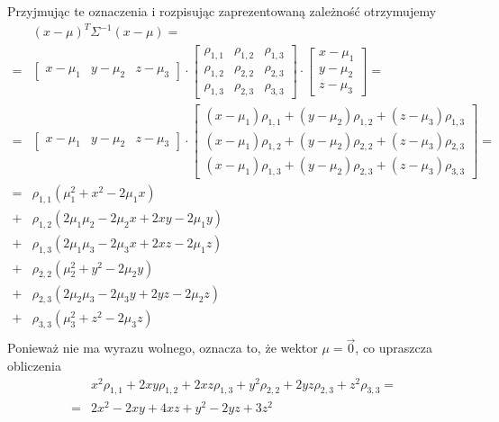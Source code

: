 Przyjmując te oznaczenia i rozpisując zaprezentowaną zależność otrzymujemy
\begin{align*}
&(x-\mu)^T\Sigma^{-1}(x-\mu)
=\\=&
\begin{bmatrix}
	x-\mu _1 & y-\mu _2 & z-\mu _3
\end{bmatrix}\cdot
\begin{bmatrix}
	\rho _{1,1} & \rho _{1,2} & \rho _{1,3} \\
	\rho _{1,2} & \rho _{2,2} & \rho _{2,3} \\
	\rho _{1,3} & \rho _{2,3} & \rho _{3,3}
\end{bmatrix}\cdot
\begin{bmatrix}
	x-\mu _1 \\
	y-\mu _2 \\
	z-\mu _3
\end{bmatrix}
=\\=&
\begin{bmatrix}
	x-\mu _1 & y-\mu _2 & z-\mu _3
\end{bmatrix}\cdot
\begin{bmatrix}
	\left(x-\mu _1\right) \rho _{1,1}+\left(y-\mu
   _2\right) \rho _{1,2}+\left(z-\mu _3\right) \rho
   _{1,3} \\
	\left(x-\mu _1\right) \rho _{1,2}+\left(y-\mu
   _2\right) \rho _{2,2}+\left(z-\mu _3\right) \rho
   _{2,3} \\
	\left(x-\mu _1\right) \rho _{1,3}+\left(y-\mu
   _2\right) \rho _{2,3}+\left(z-\mu _3\right) \rho
   _{3,3}
\end{bmatrix}
=\\=&
 \rho _{1,1} \left(\mu _1^2+x^2-2 \mu _1 x\right) \\
+&\rho _{1,2} \left(2 \mu _1 \mu _2-2 \mu _2 x+2 x y-2 \mu _1 y\right) \\
+&\rho _{1,3} \left(2 \mu _1 \mu _3-2 \mu _3 x+2 x z-2 \mu _1 z\right) \\
+&\rho _{2,2} \left(\mu _2^2+y^2-2 \mu _2 y\right) \\
+&\rho _{2,3} \left(2 \mu _2 \mu _3-2 \mu _3 y+2 y z-2 \mu _2 z\right) \\
+&\rho _{3,3} \left(\mu _3^2+z^2-2 \mu _3 z\right) \\
\end{align*}
Ponieważ nie ma wyrazu wolnego, oznacza to, że wektor $ \mu=\vec 0 $, co upraszcza obliczenia
\begin{align*}
&x^2 \rho _{1,1}+2 x y \rho _{1,2}+2 x z \rho _{1,3}+y^2 \rho _{2,2}+2 y z \rho _{2,3}+z^2 \rho _{3,3}
=\\=&
2 x^2-2 x y+4 x z+y^2-2 y z+3 z^2
\end{align*}
